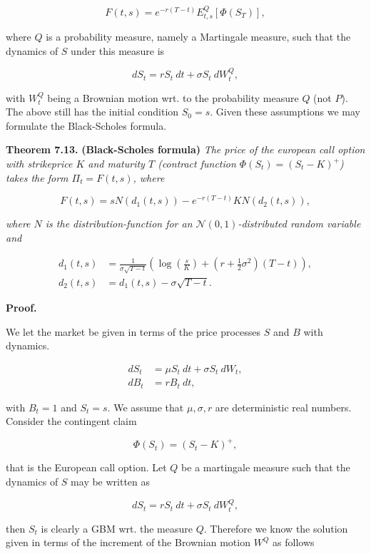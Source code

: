 \documentclass[
]{article}
\begin{document}
\[
F(t,s)=e^{-r(T-t)}E^Q_{t,s}[\Phi(S_T)],\tag{7.46}
\]

where \(Q\) is a probability measure, namely a Martingale measure, such
that the dynamics of \(S\) under this measure is

\[
dS_t=r S_t\ dt+\sigma S_t\ dW^Q_t,\tag{7.47}
\]

with \(W_t^Q\) being a Brownian motion wrt. to the probability measure
\(Q\) (not \(P\)). The above still has the initial condition \(S_0=s\).
Given these assumptions we may formulate the Black-Scholes formula.

\textbf{Theorem 7.13.} \textbf{(Black-Scholes formula)} \emph{The price
of the european call option with strikeprice \(K\) and maturity \(T\)
(contract function \(\Phi(S_t)=\left( S_t - K\right)^+\)) takes the form
\(\Pi_t=F(t,s)\), where}

\[
F(t,s)=s N(d_1(t,s))-e^{-r(T-t)}KN(d_2(t,s)),\tag{7.52}
\]

\emph{where \(N\) is the distribution-function for an
\(\mathcal{N}(0,1)\)-distributed random variable and}

\begin{align*}
d_1(t,s)&=\frac{1}{\sigma \sqrt{T-t}}\left(\log\left(\frac{s}{K}\right)+\left(r+\frac{1}{2}\sigma^2\right)(T-t)\right),\tag{7.53}\\
d_2(t,s)&=d_1(t,s)-\sigma\sqrt{T-t}.\tag{7.54}
\end{align*}

\textbf{Proof.}

We let the market be given in terms of the price processes \(S\) and
\(B\) with dynamics.

\begin{align*}
dS_t&=\mu S_t\ dt+\sigma S_t\ dW_t,\\
dB_t&=r B_t\ dt,
\end{align*}

with \(B_t=1\) and \(S_t=s\). We assume that \(\mu,\sigma, r\) are
deterministic real numbers. Consider the contingent claim

\[
\Phi(S_t)=\left( S_t - K\right)^+,
\]

that is the European call option. Let \(Q\) be a martingale measure such
that the dynamics of \(S\) may be written as

\[
dS_t=r S_t\ dt+\sigma S_t\ dW^Q_t,
\]

then \(S_t\) is clearly a GBM wrt. the measure \(Q\). Therefore we know
the solution given in terms of the increment of the Brownian motion
\(W^Q\) as follows
\end{document}
